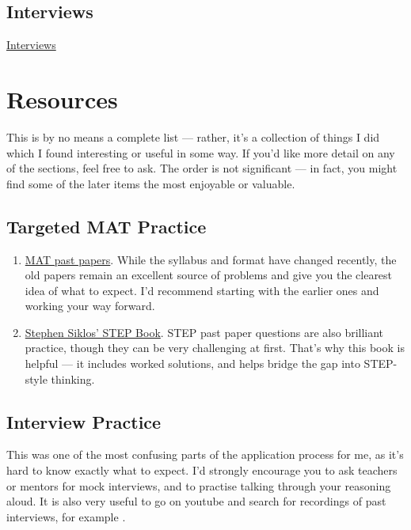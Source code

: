\documentclass[11pt]{article}
\begin{document}
\subsection{Interviews}



\href{https://www.ox.ac.uk/admissions/undergraduate/applying-to-oxford/guide/interviews}{Interviews}



\section{Resources}

This is by no means a complete list — rather, it’s a collection of things I did which I found interesting or useful in some way. If you'd like more detail on any of the sections, feel free to ask. The order is not significant — in fact, you might find some of the later items the most enjoyable or valuable.

\subsection{Targeted MAT Practice}

\begin{enumerate}
\item \href{https://www.maths.ox.ac.uk/study-here/undergraduate-study/maths-admissions-test}{MAT past papers}. While the syllabus and format have changed recently, the old papers remain an excellent source of problems and give you the clearest idea of what to expect. I’d recommend starting with the earlier ones and working your way forward.

\item \href{https://www.colmanweb.co.uk/Assets/PDF/advanced-problems-mathematics.pdf}{Stephen Siklos' STEP Book}. STEP past paper questions are also brilliant practice, though they can be very challenging at first. That’s why this book is helpful — it includes worked solutions, and helps bridge the gap into STEP-style thinking.
\end{enumerate}

\subsection{Interview Practice}

This was one of the most confusing parts of the application process for me, as it’s hard to know exactly what to expect. I’d strongly encourage you to ask teachers or mentors for mock interviews, and to practise talking through your reasoning aloud. It is also very useful to go on youtube and search for recordings of past interviews, for example \href{}{}.
\end{document}

